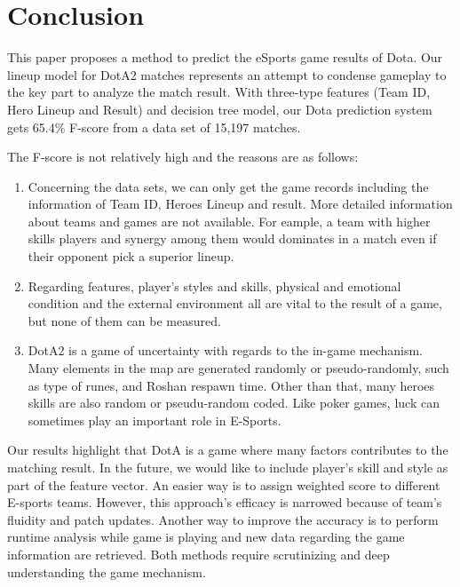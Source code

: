 \section{Conclusion}
This paper proposes a method to predict the eSports game results of Dota. Our lineup model for DotA2 matches represents an attempt to condense gameplay to the key part to analyze the match result. 
With three-type features (Team ID, Hero Lineup and Result) and decision tree model, our Dota prediction system gets 65.4\% F-score from a data set of 15,197 matches.
 
The F-score is not relatively high and the reasons are as follows:
\begin{enumerate}
\item Concerning the data sets, we can only get the game records including the information of Team ID, Heroes Lineup and result.
More detailed information about teams and games are not available. For eample, a team with higher skills players and synergy among them would dominates in a match even if their opponent pick a superior lineup.

\item Regarding features, player’s styles and skills, physical and emotional condition and the external environment all are vital to the result of a game, but none of them can be measured.

\item DotA2 is a game of uncertainty with regards to the in-game mechanism. Many elements in the map are generated randomly or pseudo-randomly, such as type of runes, and Roshan respawn time. Other than that, many heroes skills are also random or pseudu-random coded.  Like poker games, luck can sometimes play an important role in E-Sports.

\end{enumerate}
Our results highlight that DotA is a game where many factors contributes to the matching result. In the future, we would like to include player's skill and style as part of the feature vector. An easier way is to assign weighted score to different E-sports teams. However, this approach's efficacy is narrowed because of team's fluidity and patch updates. Another way to improve the accuracy is to perform runtime analysis while game is playing and new data regarding the game information are retrieved. Both methods require scrutinizing and deep understanding the game mechanism.
